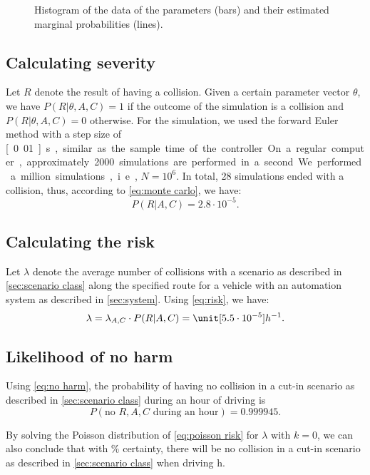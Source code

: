 \setlength{}
\setlength{}
\begin{figure}
	\centering
	
	\caption{Histogram of the data of the parameters (bars) and their estimated marginal probabilities (lines).}
	\label{fig:histogram}
\end{figure}



\subsection{Calculating severity}
\label{sec:example simulations}

Let $R$ denote the result of having a collision. Given a certain parameter vector $\theta$, we have $P(R|\theta,A,C)=1$ if the outcome of the simulation is a collision and $P(R|\theta,A,C)=0$ otherwise. For the simulation, we used the forward Euler method with a step size of \unit[0.01]{s}, similar as the sample time of the controller. On a regular computer, approximately 2000 simulations are performed in a second. We performed a million simulations, i.e., $N=10^6$. In total, 28 simulations ended with a collision, thus, according to \cref{eq:monte carlo}, we have:
\begin{equation}
	P(R|A,C) = 2.8 \cdot 10^{-5}.
\end{equation}



\subsection{Calculating the risk}
\label{sec:example risk}

Let $\lambda$ denote the average number of collisions with a scenario as described in \cref{sec:scenario class} along the specified route for a vehicle with an automation system as described in \cref{sec:system}. Using \cref{eq:risk}, we have:
\begin{equation}
	\lambda = \lambda_{A,C} \cdot P(R|A,C) = \unit[5.5 \cdot 10^{-5}]{h^{-1}}.
\end{equation}



\subsection{Likelihood of no harm}
\label{sec:example no harm}

Using \cref{eq:no harm}, the probability of having no collision in a cut-in scenario as described in \cref{sec:scenario class} during an hour of driving is
\begin{equation}
	P(\text{no }R,A,C\text{ during an hour}) = 0.999945.
\end{equation}

By solving the Poisson distribution of \cref{eq:poisson risk} for $\lambda$ with $k=0$, we can also conclude that with \unit[95]{\%} certainty, there will be no collision in a cut-in scenario as described in \cref{sec:scenario class} when driving \unit[925]{h}.
